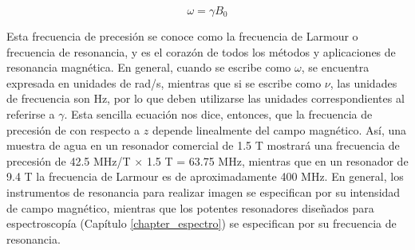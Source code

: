 \begin{equation}
 \label{eq_Larmour}
 \omega = \gamma B_0
\end{equation}

Esta frecuencia de precesión se conoce como la frecuencia de Larmour o frecuencia de resonancia, y es el corazón de todos los métodos y aplicaciones de resonancia magnética. En general, cuando se escribe como $\omega$, se encuentra expresada en unidades de rad/s, mientras que si se escribe como $\nu$, las unidades de frecuencia son Hz, por lo que deben utilizarse las unidades correspondientes al referirse a $\gamma$. Esta sencilla ecuación nos dice, entonces, que la frecuencia de precesión de \Mzero con respecto a $z$ depende linealmente del campo magnético. Así, una muestra de agua en un resonador comercial de 1.5 T mostrará una frecuencia de precesión de  42.5 MHz/T $\times$ 1.5 T = 63.75 MHz, mientras que en un resonador de 9.4 T la frecuencia de Larmour es de aproximadamente 400 MHz. En general, los instrumentos de resonancia para realizar imagen se especifican por su intensidad de campo magnético, mientras que los potentes resonadores diseñados para espectroscopía (Capítulo \ref{chapter_espectro}) se especifican por su frecuencia de resonancia.

